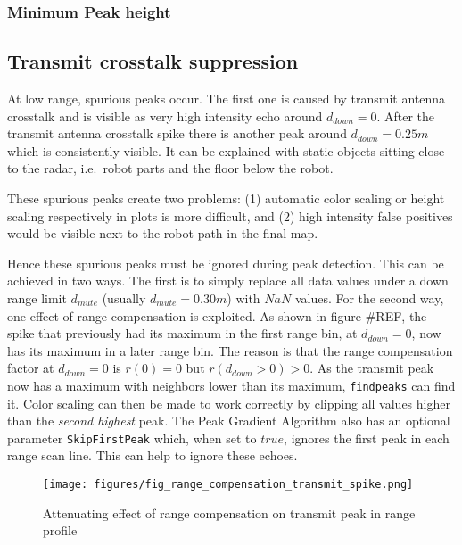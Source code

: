 \subsubsection{Minimum Peak height}\label{minimum-peak-height}

\subsection{Transmit crosstalk
suppression}\label{transmit-crosstalk-suppression}

At low range, spurious peaks occur. The first one is caused by transmit
antenna crosstalk and is visible as very high intensity echo around
\(d_{down}=0\). After the transmit antenna crosstalk spike there is
another peak around \(d_{down}=0.25m\) which is consistently visible. It
can be explained with static objects sitting close to the radar,
i.e.~robot parts and the floor below the robot.

These spurious peaks create two problems: (1) automatic color scaling or
height scaling respectively in plots is more difficult, and (2) high
intensity false positives would be visible next to the robot path in the
final map.

Hence these spurious peaks must be ignored during peak detection. This
can be achieved in two ways. The first is to simply replace all data
values under a down range limit \(d_{mute}\) (usually
\(d_{mute}=0.30m\)) with \(NaN\) values. For the second way, one effect
of range compensation is exploited. As shown in figure \#REF, the spike
that previously had its maximum in the first range bin, at
\(d_{down}=0\), now has its maximum in a later range bin. The reason is
that the range compensation factor at \(d_{down}=0\) is \(r(0) = 0\) but
\(r(d_{down}>0) > 0\). As the transmit peak now has a maximum with
neighbors lower than its maximum, \texttt{findpeaks} can find it. Color
scaling can then be made to work correctly by clipping all values higher
than the \emph{second highest} peak. The Peak Gradient Algorithm also
has an optional parameter \texttt{SkipFirstPeak} which, when set to
\(true\), ignores the first peak in each range scan line. This can help
to ignore these echoes.

\begin{figure}[htbp]
    \centering
    \label{fig:fig_range_compensation_transmit_spike}
    \texttt{[image: figures/fig\_range\_compensation\_transmit\_spike.png]}
    \caption{Attenuating effect of range compensation on transmit peak in range profile}
\end{figure}

